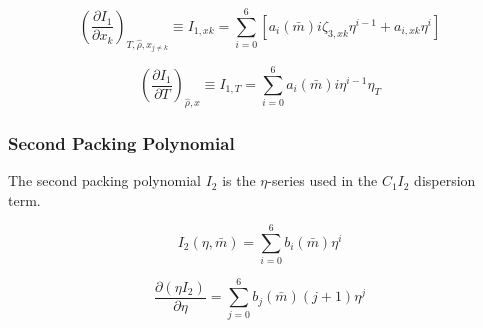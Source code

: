 \documentclass[12pt, letterpaper]{article}
\begin{document}

\begin{equation}
    \left(\frac{\partial I_{1}}{\partial x_{k}}\right)_{T,\hat{\rho},x_{j\neq k}}
    \equiv I_{1,xk}
    =\sum_{i=0}^{6}[a_i(\bar{m})i\zeta_{3,xk}\eta^{i-1}+a_{i,xk}\eta^{i}]
    \label{eq:i1_xk}
\end{equation}


\begin{equation}
    \left(\frac{\partial I_1}{\partial T}\right)_{\hat{\rho},x}
    \equiv I_{1,T}
    =\sum_{i=0}^{6}a_i(\bar m)i\eta^{i-1}\eta_T
    \label{eq:i1_dT}
\end{equation}

\subsubsection{Second Packing Polynomial}

The second packing polynomial \(I_2\) is the \(\eta\)-series used in the \(C_1 I_2\) dispersion term.

\begin{equation}
    I_{2}(\eta, \bar{m})=\sum_{i=0}^6 b_{i}(\bar{m}) \eta^i
    \label{eq:i2_disp}
\end{equation}


\begin{equation}
    \frac{\partial(\eta I_{2})}{\partial\eta}=\sum_{j=0}^6b_{j}(\bar{m})(j+1)\eta^j
    \label{eq:deta_i2_deta}
\end{equation}
\end{document}
